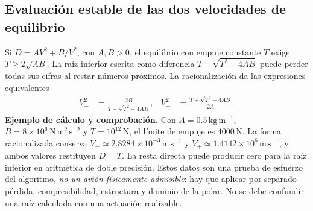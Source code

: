 \subsection{Evaluación estable de las dos velocidades de equilibrio}
Si \(D=AV^2+B/V^2\), con \(A,B>0\), el equilibrio con empuje constante
\(T\) exige \(T\geq2\sqrt{AB}\). La raíz inferior escrita como diferencia
\(T-\sqrt{T^2-4AB}\) puede perder todas sus cifras al restar números próximos.
La racionalización da las expresiones equivalentes
\begin{align}
 V_-^2&=\frac{2B}{T+\sqrt{T^2-4AB}},&
 V_+^2&=\frac{T+\sqrt{T^2-4AB}}{2A}.
\end{align}
\textbf{Ejemplo de cálculo y comprobación.} Con
\(A=0.5\,\mathrm{kg\,m^{-1}}\),
\(B=8\times10^6\,\mathrm{N\,m^2\,s^{-2}}\) y
\(T=10^{12}\,\mathrm N\), el límite de empuje es \(4000\,\mathrm N\).
La forma racionalizada conserva \(V_-\simeq2.8284\times10^{-3}\,\mathrm{m\,s^{-1}}\)
y \(V_+\simeq1.4142\times10^6\,\mathrm{m\,s^{-1}}\),
y ambos valores restituyen \(D=T\). La resta directa puede producir cero
para la raíz inferior en aritmética de doble precisión.
Estos datos son una prueba de esfuerzo del algoritmo, \emph{no un avión
físicamente admisible}: hay que aplicar por separado pérdida,
compresibilidad, estructura y dominio de la polar. No se debe confundir
una raíz calculada con una actuación realizable.
